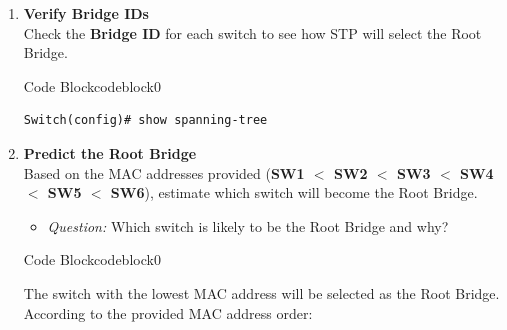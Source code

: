 \documentclass[a4paper]{book}
\begin{document}
\begin{enumerate}
	      \begin{ocg}{Code Block}{codeblock}{0}
		      \vspace{0.5cm}
		      \begin{lstlisting}
Switch(config)# spanning-tree link-type point-to-point


\end{lstlisting}

	      \end{ocg}

	\item \textbf{Verify Bridge IDs} \\
	      Check the \textbf{Bridge ID} for each switch to see how STP will select the Root Bridge.



	      \begin{ocg}{Code Block}{codeblock}{0}
		      \vspace{0.5cm}
		      \begin{lstlisting}
Switch(config)# show spanning-tree
\end{lstlisting}

	      \end{ocg}

	\item \textbf{Predict the Root Bridge} \\
	      Based on the MAC addresses provided (\textbf{SW1 $<$ SW2 $<$ SW3 $<$ SW4 $<$ SW5 $<$ SW6}), estimate which switch will become the Root Bridge.
	      \begin{itemize}
		      \item \textit{Question:} Which switch is likely to be the Root Bridge and why?
	      \end{itemize}




	      \begin{ocg}{Code Block}{codeblock}{0}
		      \vspace{0.5cm}
		      \begin{tcolorbox}
			      \small{
				      The switch with the lowest MAC address will be selected as the Root Bridge. According to the provided MAC address order:

}
\end{tcolorbox}
\end{ocg}
\end{enumerate}
\end{document}
